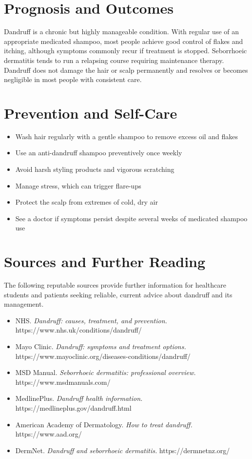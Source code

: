 \section*{Prognosis and Outcomes}
Dandruff is a chronic but highly manageable condition. With regular use of an appropriate medicated shampoo, most people achieve good control of flakes and itching, although symptoms commonly recur if treatment is stopped. Seborrhoeic dermatitis tends to run a relapsing course requiring maintenance therapy. Dandruff does not damage the hair or scalp permanently and resolves or becomes negligible in most people with consistent care.

\section*{Prevention and Self-Care}
\begin{itemize}
    \item Wash hair regularly with a gentle shampoo to remove excess oil and flakes
    \item Use an anti-dandruff shampoo preventively once weekly
    \item Avoid harsh styling products and vigorous scratching
    \item Manage stress, which can trigger flare-ups
    \item Protect the scalp from extremes of cold, dry air
    \item See a doctor if symptoms persist despite several weeks of medicated shampoo use
\end{itemize}

\section*{Sources and Further Reading}
The following reputable sources provide further information for healthcare students and patients seeking reliable, current advice about dandruff and its management.

\begin{itemize}
    \item NHS. \textit{Dandruff: causes, treatment, and prevention.} https://www.nhs.uk/conditions/dandruff/
    \item Mayo Clinic. \textit{Dandruff: symptoms and treatment options.} https://www.mayoclinic.org/diseases-conditions/dandruff/
    \item MSD Manual. \textit{Seborrhoeic dermatitis: professional overview.} https://www.msdmanuals.com/
    \item MedlinePlus. \textit{Dandruff health information.} https://medlineplus.gov/dandruff.html
    \item American Academy of Dermatology. \textit{How to treat dandruff.} https://www.aad.org/
    \item DermNet. \textit{Dandruff and seborrhoeic dermatitis.} https://dermnetnz.org/
\end{itemize}
